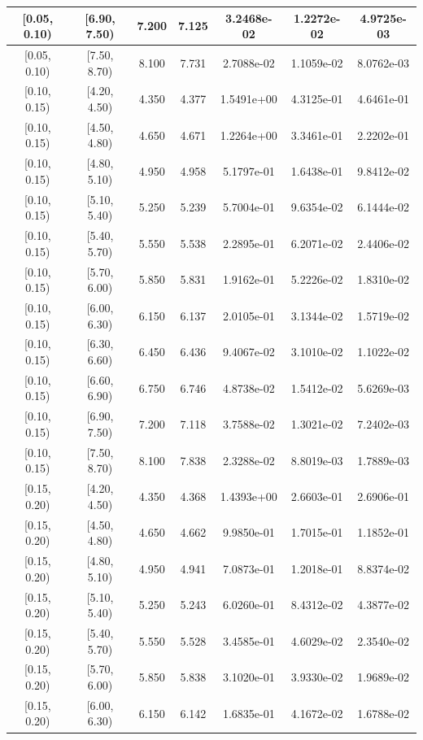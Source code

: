 \begin{longtable}{|c|c|c|c|c|c|c|}
\hline
[0.05, 0.10) & [6.90, 7.50) & 7.200 & 7.125 & 3.2468e-02 & 1.2272e-02 & 4.9725e-03 \\ 
\hline
[0.05, 0.10) & [7.50, 8.70) & 8.100 & 7.731 & 2.7088e-02 & 1.1059e-02 & 8.0762e-03 \\ 
\hline
[0.10, 0.15) & [4.20, 4.50) & 4.350 & 4.377 & 1.5491e+00 & 4.3125e-01 & 4.6461e-01 \\ 
\hline
[0.10, 0.15) & [4.50, 4.80) & 4.650 & 4.671 & 1.2264e+00 & 3.3461e-01 & 2.2202e-01 \\ 
\hline
[0.10, 0.15) & [4.80, 5.10) & 4.950 & 4.958 & 5.1797e-01 & 1.6438e-01 & 9.8412e-02 \\ 
\hline
[0.10, 0.15) & [5.10, 5.40) & 5.250 & 5.239 & 5.7004e-01 & 9.6354e-02 & 6.1444e-02 \\ 
\hline
[0.10, 0.15) & [5.40, 5.70) & 5.550 & 5.538 & 2.2895e-01 & 6.2071e-02 & 2.4406e-02 \\ 
\hline
[0.10, 0.15) & [5.70, 6.00) & 5.850 & 5.831 & 1.9162e-01 & 5.2226e-02 & 1.8310e-02 \\ 
\hline
[0.10, 0.15) & [6.00, 6.30) & 6.150 & 6.137 & 2.0105e-01 & 3.1344e-02 & 1.5719e-02 \\ 
\hline
[0.10, 0.15) & [6.30, 6.60) & 6.450 & 6.436 & 9.4067e-02 & 3.1010e-02 & 1.1022e-02 \\ 
\hline
[0.10, 0.15) & [6.60, 6.90) & 6.750 & 6.746 & 4.8738e-02 & 1.5412e-02 & 5.6269e-03 \\ 
\hline
[0.10, 0.15) & [6.90, 7.50) & 7.200 & 7.118 & 3.7588e-02 & 1.3021e-02 & 7.2402e-03 \\ 
\hline
[0.10, 0.15) & [7.50, 8.70) & 8.100 & 7.838 & 2.3288e-02 & 8.8019e-03 & 1.7889e-03 \\ 
\hline
[0.15, 0.20) & [4.20, 4.50) & 4.350 & 4.368 & 1.4393e+00 & 2.6603e-01 & 2.6906e-01 \\ 
\hline
[0.15, 0.20) & [4.50, 4.80) & 4.650 & 4.662 & 9.9850e-01 & 1.7015e-01 & 1.1852e-01 \\ 
\hline
[0.15, 0.20) & [4.80, 5.10) & 4.950 & 4.941 & 7.0873e-01 & 1.2018e-01 & 8.8374e-02 \\ 
\hline
[0.15, 0.20) & [5.10, 5.40) & 5.250 & 5.243 & 6.0260e-01 & 8.4312e-02 & 4.3877e-02 \\ 
\hline
[0.15, 0.20) & [5.40, 5.70) & 5.550 & 5.528 & 3.4585e-01 & 4.6029e-02 & 2.3540e-02 \\ 
\hline
[0.15, 0.20) & [5.70, 6.00) & 5.850 & 5.838 & 3.1020e-01 & 3.9330e-02 & 1.9689e-02 \\ 
\hline
[0.15, 0.20) & [6.00, 6.30) & 6.150 & 6.142 & 1.6835e-01 & 4.1672e-02 & 1.6788e-02 \\ 

\end{longtable}
